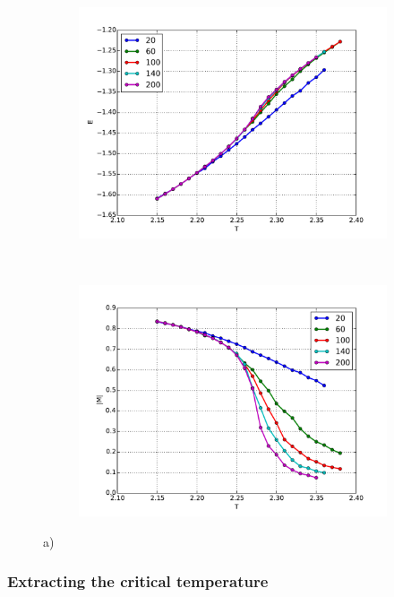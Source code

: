 \begin{figure}[H]
    \centering
    \begin{subfigure}{0.5\textwidth}
        \centering
        \includegraphics[width=\linewidth]{result/bilder/Tc/e-Tc}
        \caption{}
    \end{subfigure}%
    ~ 
    \begin{subfigure}{0.5\textwidth}
        \centering
        \includegraphics[width=\linewidth]{result/bilder/Tc/m-Tc}
        \caption{}
    \end{subfigure}
    \caption{a) }
    \label{fig:tc-E-M}
\end{figure}

\subsubsection{Extracting the critical temperature}


